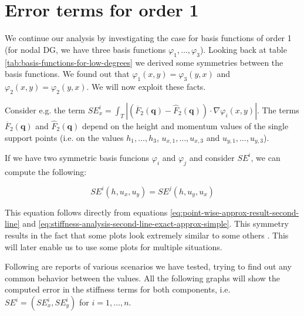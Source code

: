 \documentclass{article}
\renewcommand{\phi}{\varphi}
\begin{document}
\section{Error terms for order 1}
\label{sec:stiffness-analysis-first-touch}

We continue our analysis by investigating the case for basis functions of order 1 (for nodal DG, we have three basis functions $\phi_1,\dots,\phi_3$). Looking back at table \ref{tab:basis-functions-for-low-degrees} we derived some symmetries between the basis functions. We found out that $\phi_1(x,y)=\phi_3(y,x)$ and $\phi_2(x,y)=\phi_2(y,x)$. We will now exploit these facts.

Consider e.g. the term $SE_x^i = \int_T \left| \left(\overline{F}_2(\mathbf{q})-\widehat{F}_2(\mathbf{q})\right) \cdot \nabla\phi_i(x,y) \right|$. The terms $\overline{F}_2(\mathbf{q})$ and $\widehat{F}_2(\mathbf{q})$ depend on the height and momentum values of the single support points (i.e. on the values $h_1,\dots,h_3$, $u_{x,1},\dots,u_{x,3}$ and $u_{y,1},\dots,u_{y,3}$).

If we have two symmetric basis funcions $\phi_i$ and $\phi_j$ and consider $SE^i$, we can compute the following:

\begin{equation*}
  SE^i(h, u_x, u_y) = SE^j(h, u_y, u_x)
\end{equation*}

This equation follows directly from equations \eqref{eq:point-wise-approx-result-second-line} and \eqref{eq:stiffness-analysis-second-line-exact-approx-simple}. This symmetry results in the fact that some plots look extremely similar to some others 
. This will later enable us to use some plots for multiple situations.


Following are reports of various scenarios we have tested, trying to find out any common behavior between the values. All the following graphs will show the computed error in the stiffness terms for both components, i.e. $SE^i = \left(SE_x^i, SE_y^i\right)$ for $i=1,\dots, n$.
\end{document}
